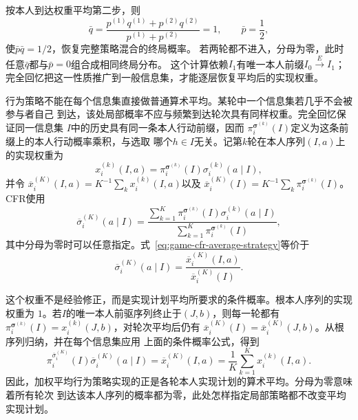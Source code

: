 按本人到达权重平均第二步，则
\[
 \bar q=
 \frac{p^{(1)}q^{(1)}+p^{(2)}q^{(2)}}{p^{(1)}+p^{(2)}}=1,
 \qquad \bar p=\frac12,
\]
使$\bar p\bar q=1/2$，恢复完整策略混合的终局概率。
若两轮都不进入，分母为零，此时任意$\bar q$都与$\bar p=0$组合成相同终局分布。
这个计算依赖$I_1$有唯一本人前缀$I_0\xrightarrow{E}I_1$；
完全回忆把这一性质推广到一般信息集，才能逐层恢复平均后的实现权重。

行为策略不能在每个信息集直接做普通算术平均。某轮中一个信息集若几乎不会被参与者自己
到达，该处局部概率不应与频繁到达轮次具有同样权重。完全回忆保证同一信息集
\(I\)中的历史具有同一条本人行动前缀，因而
\(\pi_i^{\bm{\sigma}^{(k)}}(I)\)定义为这条前缀上的本人行动概率乘积，与选取
哪个\(h\in I\)无关。记第\(k\)轮在本人序列\((I,a)\)上的实现权重为
\[
  x_i^{(k)}(I,a)
  =
  \pi_i^{\bm{\sigma}^{(k)}}(I)
  \sigma_i^{(k)}(a\mid I),
\]
并令
\(\overline{x}_i^{(K)}(I,a)=K^{-1}\sum_k x_i^{(k)}(I,a)\)以及
\(\overline{x}_i^{(K)}(I)=K^{-1}\sum_k
\pi_i^{\bm{\sigma}^{(k)}}(I)\)。CFR使用
\begin{equation}
  \overline{\sigma}_i^{(K)}(a\mid I)
  =
  \frac{
    \sum_{k=1}^{K}
    \pi_i^{\bm{\sigma}^{(k)}}(I)
    \sigma_i^{(k)}(a\mid I)
  }{
    \sum_{k=1}^{K}
    \pi_i^{\bm{\sigma}^{(k)}}(I)
  },
  \label{eq:game-cfr-average-strategy}
\end{equation}
其中分母为零时可以任意指定。式~\eqref{eq:game-cfr-average-strategy}等价于
\[
  \overline{\sigma}_i^{(K)}(a\mid I)
  =
  \frac{\overline{x}_i^{(K)}(I,a)}{\overline{x}_i^{(K)}(I)}.
\]

这个权重不是经验修正，而是实现计划平均所要求的条件概率。根本人序列的实现权重为
\(1\)。若\(I\)的唯一本人前驱序列终止于\((J,b)\)，则每一轮都有
\(\pi_i^{\bm{\sigma}^{(k)}}(I)=x_i^{(k)}(J,b)\)，对轮次平均后仍有
\(\overline{x}_i^{(K)}(I)=\overline{x}_i^{(K)}(J,b)\)。从根序列归纳，并在每个信息集应用
上面的条件概率公式，得到
\begin{equation}
  \pi_i^{\overline{\sigma}_i^{(K)}}(I)
  \overline{\sigma}_i^{(K)}(a\mid I)
  =
  \overline{x}_i^{(K)}(I,a)
  =
  \frac{1}{K}\sum_{k=1}^{K}x_i^{(k)}(I,a).
  \label{eq:game-average-realization-plan}
\end{equation}
因此，加权平均行为策略实现的正是各轮本人实现计划的算术平均。分母为零意味着所有轮次
到达该本人序列的概率都为零，此处怎样指定局部策略都不改变平均实现计划。

